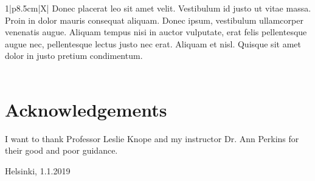 \documentclass[12pt, a4paper, oneside]{article}
\begin{document}
\begin{table}[h]
\begin{tabularx}{1\textwidth}{|p{8.5cm}|X|}
{            Donec placerat leo sit amet velit. Vestibulum id justo ut vitae massa.
            Proin in dolor mauris consequat aliquam. Donec ipsum, vestibulum ullamcorper venenatis augue.
            Aliquam tempus nisi in auctor vulputate, erat felis pellentesque augue nec,
            pellentesque lectus justo nec erat. Aliquam et nisl. Quisque sit amet dolor in justo pretium condimentum.
        } \\ [13cm] \hline
         \\ [1cm] \hline
    \end{tabularx}
    \label{tab:abstract}
\end{table}

\restoregeometry
\clearpage


\normalsize
\onehalfspacing

\section*{Acknowledgements} \label{sec:acknowledgements}

I want to thank Professor Leslie Knope and my instructor Dr. Ann Perkins for their good and poor guidance.

\vspace{1cm}
\begin{FlushRight}
    Helsinki, 1.1.2019 \par
    \thesisauthor
\end{FlushRight}

\clearpage


\doublespacing

\tableofcontents

\clearpage

\listoffigures
\listoftables

\end{document}
